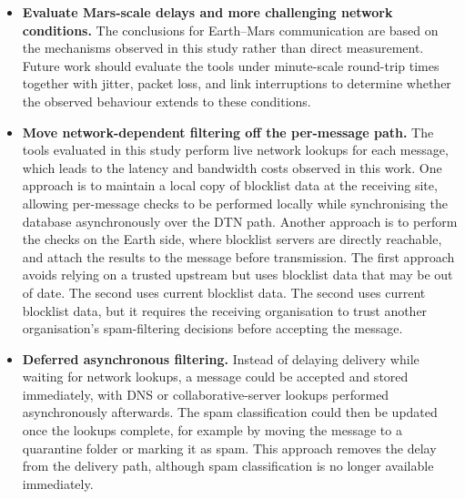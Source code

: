 \begin{itemize}

\item \textbf{Evaluate Mars-scale delays and more challenging network conditions.}
The conclusions for Earth--Mars communication are based on the mechanisms
observed in this study rather than direct measurement. Future work should
evaluate the tools under minute-scale round-trip times together with jitter,
packet loss, and link interruptions to determine whether the observed behaviour
extends to these conditions.

\item \textbf{Move network-dependent filtering off the per-message path.} The
tools evaluated in this study perform live network lookups for each message,
which leads to the latency and bandwidth costs observed in this work. One
approach is to maintain a local copy of blocklist data at the receiving site,
allowing per-message checks to be performed locally while synchronising the
database asynchronously over the DTN path. Another approach is to perform the
checks on the Earth side, where blocklist servers are directly reachable, and
attach the results to the message before transmission. The first approach avoids relying on a trusted upstream but uses blocklist data that may be out of date. The second uses current blocklist data. The second uses current blocklist data, but it requires the receiving organisation to trust another organisation's spam-filtering decisions before accepting the message.

\item \textbf{Deferred asynchronous filtering.} Instead of delaying delivery while waiting for network lookups, a message could be accepted and stored immediately, with DNS or collaborative-server lookups performed asynchronously afterwards. The spam classification could then be updated once the lookups complete, for example by moving the message to a quarantine folder or marking it as spam. This approach removes the delay from the delivery path, although spam classification is no longer available immediately.

\end{itemize}